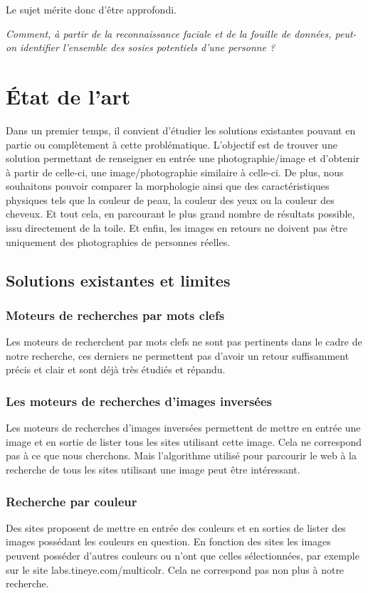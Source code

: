 \documentclass[a4paper,12pt]{article}
\begin{document}
Le sujet mérite donc d'être approfondi. 

\textit{Comment, à partir de la reconnaissance faciale et de la fouille de données, peut-on identifier l'ensemble des sosies potentiels d'une personne ? }
\section{État de l'art}
Dans un premier temps, il convient d'étudier les solutions existantes pouvant en partie ou complètement à cette problématique. 
L'objectif est de trouver une solution permettant de renseigner en entrée une photographie/image et d'obtenir à partir de celle-ci, une image/photographie similaire à celle-ci. De plus, nous souhaitons pouvoir comparer la morphologie ainsi que des caractéristiques physiques tels que la couleur de peau, la couleur des yeux ou la couleur des cheveux. Et tout cela, en parcourant le plus grand nombre de résultats possible, issu directement de la toile. Et enfin, les images en retours ne doivent pas être uniquement des photographies de personnes réelles.

\subsection{Solutions existantes et limites}
\subsubsection{Moteurs de recherches par mots clefs}
Les moteurs de recherchent par mots clefs ne sont pas pertinents dans le cadre de notre recherche, ces derniers ne permettent pas d'avoir un retour suffisamment précis et clair et sont déjà très étudiés et répandu. 
\subsubsection{Les moteurs de recherches d'images inversées}
Les moteurs de recherches d'images inversées permettent de mettre en entrée une image et en sortie de lister tous les sites utilisant cette image. Cela ne correspond pas à ce que nous cherchons. Mais l'algorithme utilisé pour parcourir le web à la recherche de tous les sites utilisant une image peut être intéressant. 
\subsubsection{Recherche par couleur}
Des sites proposent de mettre en entrée des couleurs et en sorties de lister des images possédant les couleurs en question. En fonction des sites les images peuvent posséder d'autres couleurs ou n'ont que celles sélectionnées, par exemple sur le site labs.tineye.com/multicolr. Cela ne correspond pas non plus à notre recherche. 
\end{document}
